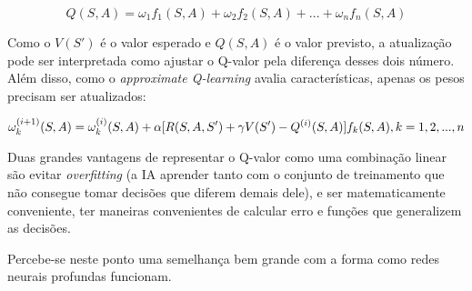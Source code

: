 \begin{equation} \label{eq:q_lin_comb}
Q(S,A) = \omega_{1}f_{1}(S,A) + \omega_{2}f_{2}(S,A) + ... + \omega_{n}f_{n}(S,A)
\end{equation}

Como o $V(S')$ é o valor esperado e $Q(S,A)$ é o valor previsto, a atualização pode ser interpretada como ajustar o Q-valor pela diferença desses dois número. Além disso, como o \textit{approximate Q-learning} avalia características, apenas os pesos precisam ser atualizados:

\begin{equation} \label{eq:w_update}
\omega_{k}^{(i+1)}(S,A) = \omega_{k}^{(i)}(S,A) + \alpha[R(S,A,S') + \gamma V(S') - Q^{(i)}(S,A)]f_{k}(S,A), \hfill k = 1, 2, ..., n
\end{equation}

Duas grandes vantagens de representar o Q-valor como uma combinação linear são evitar \textit{overfitting} (a IA aprender tanto com o conjunto de treinamento que não consegue tomar decisões que diferem demais dele), e ser matematicamente conveniente, ter maneiras convenientes de calcular erro e funções que generalizem as decisões.

Percebe-se neste ponto uma semelhança bem grande com a forma como redes neurais profundas funcionam.
